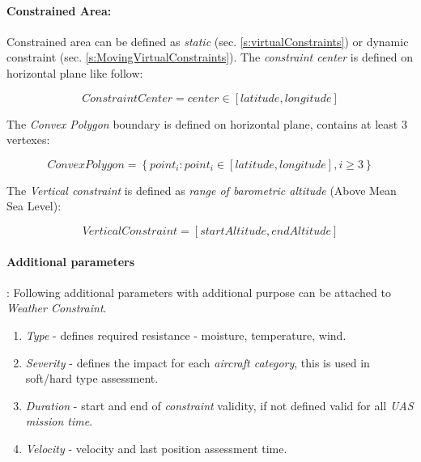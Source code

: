 \paragraph{Constrained Area:} Constrained area can be defined as \emph{static} (sec. \ref{s:virtualConstraints}) or dynamic constraint (sec. \ref{s:MovingVirtualConstraints}).  The \emph{constraint center} is defined on horizontal plane like follow:

\begin{equation}
    Constraint Center = center \in \left [latitude, longitude\right]
\end{equation}

\noindent The \emph{Convex Polygon} boundary is defined on horizontal plane, contains at least 3 vertexes:

\begin{equation}
    Convex Polygon = \left\{point_i:point_i\in \left [latitude, longitude\right], i \ge 3\right\}
\end{equation}

\noindent The \emph{Vertical constraint} is defined as \emph{range of barometric altitude} (Above Mean Sea Level):

\begin{equation}
    Vertical Constraint = \left [ start Altitude, end Altitude \right ]
\end{equation}

\paragraph{Additional parameters}: Following additional parameters with additional purpose can be attached to \emph{Weather Constraint}.
\begin{enumerate}
    \item \emph{Type} - defines required resistance - moisture, temperature, wind.
    
    \item \emph{Severity} - defines the impact for each \emph{aircraft category}, this is used in soft/hard type assessment. 
    
    \item \emph{Duration} - start and end of \emph{constraint} validity, if not defined valid for all \emph{UAS mission time}.
    
    \item \emph{Velocity} - velocity and last position assessment time.
\end{enumerate}

